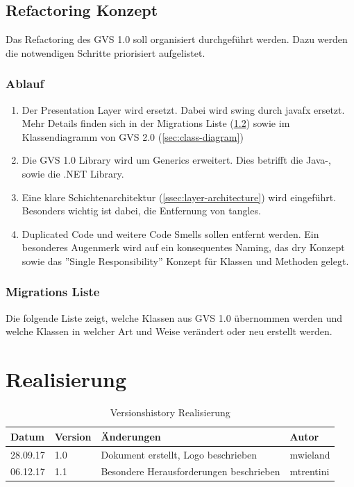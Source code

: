 \documentclass[11pt,a4paper,english,oneside]{book}
\numberwithin{equation}{chapter}
\begin{document}
	\section{Refactoring Konzept} \label{sec:refactroing-conpet}
	Das Refactoring des GVS 1.0 soll organisiert durchgeführt werden. Dazu werden die notwendigen Schritte priorisiert aufgelistet.
		
	\subsection{Ablauf}\label{ssec:ablauf}
	\begin{enumerate}
		\item Der Presentation Layer wird ersetzt. Dabei wird \gls{swing} durch \gls{javafx} ersetzt. Mehr Details finden sich in der Migrations Liste (\ref{ssec:class-refactroing-list}) sowie im Klassendiagramm von GVS 2.0 (\ref{sec:class-diagram})
		\item Die GVS 1.0 Library wird um Generics erweitert. Dies betrifft die Java-, sowie die .NET Library.
		\item Eine klare Schichtenarchitektur (\ref{ssec:layer-architecture}) wird eingeführt. Besonders wichtig ist dabei, die Entfernung von \gls{tangle}s.
		\item Duplicated Code und weitere Code Smells sollen entfernt werden. Ein besonderes Augenmerk wird auf ein konsequentes Naming, das \gls{dry} Konzept sowie das ''Single Responsibility'' Konzept für Klassen und Methoden gelegt.
	\end{enumerate}

	\subsection{Migrations Liste}
	\label{ssec:class-refactroing-list}
	Die folgende Liste zeigt, welche Klassen aus GVS 1.0 übernommen werden und welche Klassen in welcher Art und Weise verändert oder neu erstellt werden.
	
	
	
	\chapter{Realisierung}
		
	\begin{table}[h!]
	\centering
	\begin{tabularx}{\linewidth}{l l X l}
		\toprule 
		Datum & Version & Änderungen & Autor \\
		\midrule
		28.09.17 & 1.0 & Dokument erstellt, Logo beschrieben & mwieland \\
		06.12.17 & 1.1 & Besondere Herausforderungen beschrieben & mtrentini \\
		\bottomrule 
	\end{tabularx} 
	\caption{Versionshistory Realisierung} 
	\end{table}
	
\end{document}
